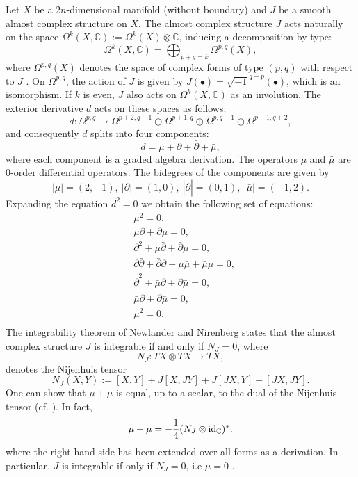 \documentclass[12pt, twoside]{article}
\theoremstyle{definition}
\numberwithin{equation}{section}
\def \C {\mathbb{C}}
\def\Om{\Omega}
\def\pa{\partial}
\begin{document}
Let $X$ be a $2n$-dimensional manifold (without boundary) and $J$ be a smooth almost complex structure on $X$. The almost complex structure $J$ acts naturally on the space  $\Om^{k}(X,\C):=\Om^{k}(X)\otimes\C$, inducing a decomposition by type:
	$$\Om^{k}(X,\C)=\bigoplus_{p+q=k}\Om^{p,q}(X),$$
	where  $\Om^{p,q}(X)$ denotes the space of complex forms of type $(p,q)$ with respect to $J$ \cite{HMT}. On $\Om^{p,q}$, the action of $J$ is given by $J(\bullet)=\sqrt{-1}^{q-p}(\bullet)$, which is an isomorphism. If $k$ is even, $J$ also acts on $\Om^{k}(X,\mathbb{C})$ as an involution.  The exterior derivative $d$ acts on these spaces as follows:
	\[d:\Om^{p,q}\rightarrow\Om^{p+2,q-1}\oplus\Om^{p+1,q}\oplus\Om^{p,q+1}\oplus\Om^{p-1,q+2},\]
	and consequently $d$ splits into four components:
	\[d=\mu+\pa+\bar{\pa}+\bar{\mu},\]
	where each component is a graded algebra derivation. The operators $\mu$ and $\bar{\mu}$ are $0$-order differential operators. 
	The bidegrees of the components are given by
	\[|\mu|=(2,-1),\ |\pa|=(1,0),\ |\bar{\pa}|=(0,1),\ |\bar{\mu}|=(-1,2).\]
	Expanding the equation $d^{2}=0$ we obtain the following set of equations:
	\begin{equation}\label{E27}
	\begin{split}
	&\mu^{2}=0,\\
	&\mu\pa+\pa\mu=0,\\
	&\pa^{2}+\mu\bar{\pa}+\bar{\pa}\mu=0,\\
	&\pa\bar{\pa}+\bar{\pa}\pa+\mu\bar{\mu}+\bar{\mu}\mu=0,\\
	&\bar{\pa}^{2}+\bar{\mu}\pa+\pa\bar{\mu}=0,\\
	&\bar{\mu}\bar{\pa}+\bar{\pa}\bar{\mu}=0,\\
	&\bar{\mu}^{2}=0.\\
	\end{split}
	\end{equation} 
The integrability theorem of Newlander and Nirenberg states that the almost complex structure $J$ is integrable if and only if $N_{J}=0$, where
$$N_{J}:TX\otimes TX\rightarrow TX,$$
denotes the Nijenhuis tensor
$$N_{J}(X,Y):=[X,Y]+J[X,JY]+J[JX,Y]-[JX,JY].$$ 
One can show that $\mu+\bar{\mu}$ is equal, up to a scalar, to the dual of the Nijenhuis tensor (cf. \cite{CW20}). In fact,
$$\mu+\bar{\mu}=-\frac{1}{4}(N_{J}\otimes{\rm{id}_{\C} })^{\ast}.$$
where the right hand side has been extended over all forms as a derivation. In particular,  $J$ is integrable if only if $N_{J}=0$, i.e $\mu=0$ \cite{CW20,CW21}.
	
\end{document}
